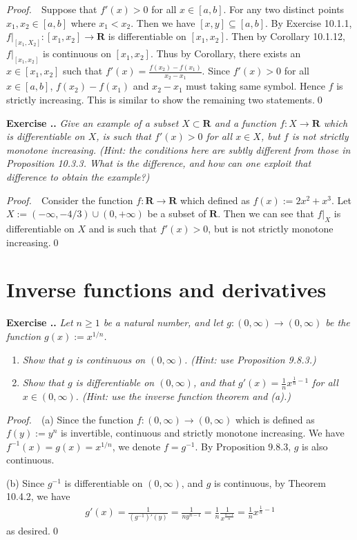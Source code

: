 \documentclass{book}
\newcommand{\pff}{\vspace{.25em}\noindent\emph{Proof.}~~}
\newcounter{Exercise}[section]
\renewcommand{\theExercise}{\thesection.\arabic{Exercise}.}
\newcommand{\new}{\vspace{1.5em}\noindent\textbf{{Exercise \stepcounter{Exercise}\textbf{\theExercise}}} }
\begin{document}
\pff Suppose that $f'(x)>0$ for all $x\in[a,b]$. For any two distinct points $x_1,x_2\in[a,b]$ where $x_1<x_2$. Then we have $[x,y]\subseteq[a,b]$. By Exercise 10.1.1, $f|_{[x_1,X_2]}:[x_1,x_2]\to\mathbf{R}$ is differentiable on $[x_1,x_2]$. Then by Corollary 10.1.12, $f|_{[x_1,x_2]}$ is continuous on $[x_1,x_2]$. Thus by Corollary, there exists an $x\in[x_1,x_2]$ such that $f'(x)=\frac{f(x_2)-f(x_1)}{x_2-x_1}$. Since $f'(x)>0$ for all $x\in[a,b]$, $f(x_2)-f(x_1)$ and $x_2-x_1$ must taking same symbol. Hence $f$ is strictly increasing. This is similar to show the remaining two statements.\qed

\new\emph{Give an example of a subset $X\subset\mathbf{R}$ and a function $f:X\to\mathbf{R}$ which is differentiable on $X$, is such that $f'(x)>0$ for all $x\in X$, but $f$ is not strictly monotone increasing. (Hint: the conditions here are subtly different from those in Proposition 10.3.3. What is the difference, and how can one exploit that difference to obtain the example?)}

\pff Consider the function $f:\mathbf{R}\to\mathbf{R}$ which defined as $f(x):=2x^2+x^3$. Let $X:=(-\infty,-4/3)\cup(0,+\infty)$ be a subset of $\mathbf{R}$. Then we can see that $f|_X$ is differentiable on $X$ and is such that $f'(x)>0$, but is not strictly monotone increasing.\qed

\section{Inverse functions and derivatives}
\new\emph{Let $n\geq 1$ be a natural number, and let $g:(0,\infty)\to(0,\infty)$ be the function $g(x):=x^{1/n}$.}
\begin{enumerate}
    \item \emph{Show that $g$ is continuous on $(0,\infty)$. (Hint: use Proposition 9.8.3.)}
    \item \emph{Show that $g$ is differentiable on $(0,\infty)$, and that $g'(x)=\frac{1}{n}x^{\frac{1}{n}-1}$ for all $x\in(0,\infty)$. (Hint: use the inverse function theorem and (a).)}
\end{enumerate}

\pff (a) Since the function $f:(0,\infty)\to(0,\infty)$ which is defined as $f(y):=y^n$ is invertible, continuous and strictly monotone increasing. We have $f^{-1}(x)=g(x)=x^{1/n}$, we denote $f=g^{-1}$. By Proposition 9.8.3, $g$ is also continuous.

(b) Since $g^{-1}$ is differentiable on $(0,\infty)$, and $g$ is continuous, by Theorem 10.4.2, we have
    \begin{align*}
        g'(x)=\frac{1}{(g^{-1})'(y)}=\frac{1}{ny^{n-1}}=\frac{1}{n}\frac{1}{x^{\frac{n-1}{n}}}=\frac{1}{n}x^{\frac{1}{n}-1}
    \end{align*}
as desired.\qed
\end{document}
